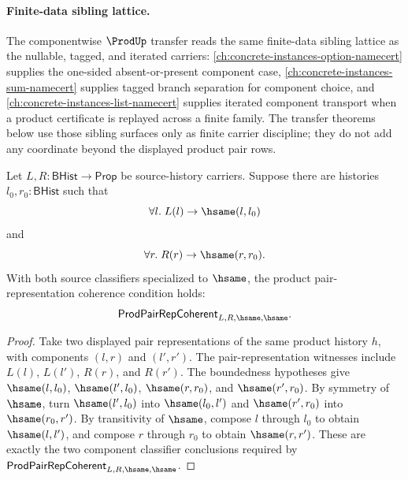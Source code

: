 \paragraph{Finite-data sibling lattice.}
The componentwise $\ProdUp$ transfer reads the same finite-data sibling lattice as the nullable, tagged, and iterated carriers: \autoref{ch:concrete-instances-option-namecert} supplies the one-sided absent-or-present component case, \autoref{ch:concrete-instances-sum-namecert} supplies tagged branch separation for component choice, and \autoref{ch:concrete-instances-list-namecert} supplies iterated component transport when a product certificate is replayed across a finite family. The transfer theorems below use those sibling surfaces only as finite carrier discipline; they do not add any coordinate beyond the displayed product pair rows.

\begin{theorem}
\label{thm:prod-pair-rep-bounded-hsame-coherence}
Let $L,R:\mathsf{BHist}\to\mathsf{Prop}$ be source-history carriers. Suppose
there are histories $l_0,r_0:\mathsf{BHist}$ such that
$$
\forall l.\;L(l)\to\hsame(l,l_0)
$$
and
$$
\forall r.\;R(r)\to\hsame(r,r_0).
$$
With both source classifiers specialized to $\hsame$, the product
pair-representation coherence condition holds:
$$
\mathsf{ProdPairRepCoherent}_{L,R,\hsame,\hsame}.
$$
\end{theorem}
\begin{proof}
Take two displayed pair representations of the same product history $h$, with
components $(l,r)$ and $(l',r')$. The pair-representation witnesses include
$L(l)$, $L(l')$, $R(r)$, and $R(r')$. The boundedness hypotheses give
$\hsame(l,l_0)$, $\hsame(l',l_0)$, $\hsame(r,r_0)$, and $\hsame(r',r_0)$.
By symmetry of $\hsame$, turn $\hsame(l',l_0)$ into $\hsame(l_0,l')$ and
$\hsame(r',r_0)$ into $\hsame(r_0,r')$. By transitivity of $\hsame$, compose
$l$ through $l_0$ to obtain $\hsame(l,l')$, and compose $r$ through $r_0$ to
obtain $\hsame(r,r')$. These are exactly the two component classifier
conclusions required by $\mathsf{ProdPairRepCoherent}_{L,R,\hsame,\hsame}$.
\end{proof}

